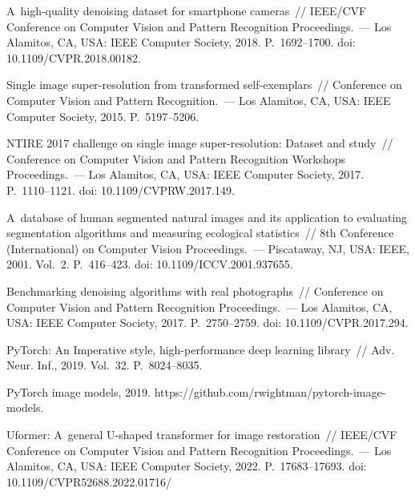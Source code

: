\begin{multicols}{2}
{{\begin{thebibliography}{99}
     A~high-quality denoising dataset for smartphone cameras~// 
    IEEE/CVF Conference on Computer Vision and Pattern Recognition Proceedings.~--- Los Alamitos, 
CA, USA: IEEE Computer Society, 2018. P.~1692--1700.
    doi: 10.1109/CVPR.2018.00182.
    
Single     image super-resolution from transformed self-exemplars~// Conference 
on Computer Vision and Pattern Recognition.~--- Los Alamitos, CA, USA: 
IEEE Computer Society, 2015. P.~5197--5206.
    
     NTIRE 2017 challenge 
on single    image super-resolution: Dataset and study~//  Conference 
on Computer Vision and Pattern Recognition Workshops Proceedings.~--- Los Alamitos, 
CA, USA: IEEE Computer Society, 2017. P.~1110--1121. doi: 
10.1109/CVPRW.2017.149.
    
    A~database of human segmented natural images and its application to 
evaluating
    segmentation algorithms and measuring ecological statistics~//  
8th  Conference (International) on Computer Vision Proceedings.~--- 
Piscataway, NJ, USA: IEEE, 2001. Vol.~2. P.~416--423. doi: 10.1109/ICCV.2001.937655.
    
     Benchmarking denoising 
algorithms  with     real photographs~// Conference on Computer Vision 
and Pattern Recognition Proceedings.~--- Los Alamitos, CA, USA: IEEE Computer Society, 
2017. P.~2750--2759. doi: 10.1109/CVPR.2017.294.
    
    PyTorch: An Imperative style, high-performance deep learning library~//
    Adv. Neur. Inf., 2019. Vol.~32. P.~8024--8035.
   
     PyTorch image models, 2019.
    {\sf  https://github.com/rwightman/pytorch-image-models}.
    
    Uformer: A~general U-shaped transformer for image restoration~// 
IEEE/CVF Conference on Computer Vision and Pattern Recognition Proceedings.~--- Los 
Alamitos, CA, USA: IEEE Computer Society, 2022. P.~17683--17693. doi: 
10.1109/CVPR52688.2022.01716/
    

\end{thebibliography}}}
\end{multicols}
